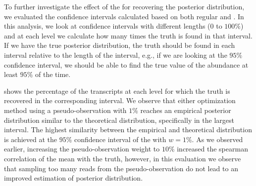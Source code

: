 To further investigate the effect of the \aboots for recovering the posterior distribution,
we evaluated the confidence intervals calculated based on both regular \boots and \aboots.
In this analysis, we look at confidence intervals with different lengths (0 to $100\%$) and at 
each level we calculate how many times the truth is found in that interval. 
If we have the true posterior distribution, the truth should be found in each interval 
relative to the length of the interval, e.g., if we are looking at the $95\%$ confidence interval,
we should be able to find the true value of the abundance at least $95\%$ of the time.

 shows the percentage of the transcripts at each level for which the truth
is recovered in the corresponding interval. We observe that either optimization method
using a pseudo-observation with $1\%$ reaches an empirical posterior distribution similar
to the theoretical distribution, specifically in the largest interval.
The highest similarity between the empirical and theoretical distribution 
is achieved at the $95\%$ confidence interval of the \aboots with $w=1\%$.
As we observed earlier, increasing the pseudo-observation weight to $10\%$ increased the spearman
correlation of the mean with the truth, however, in this evaluation we observe that sampling too
many reads from the pseudo-observation do not lead to an improved estimation of posterior distribution.


